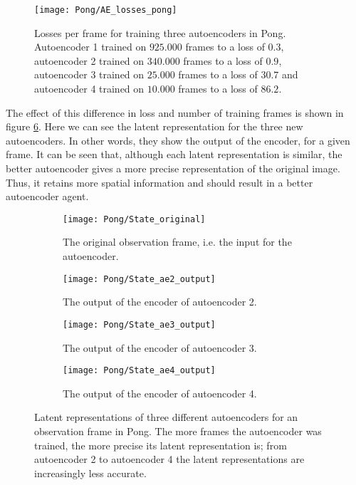 \begin{figure}[h]
    \centering
   	\texttt{[image: Pong/AE\_losses\_pong]}
    	\caption{Losses per frame for training three autoencoders in Pong. Autoencoder 1 trained on $925.000$ frames to a loss of $0.3$, autoencoder 2 trained on $340.000$ frames to a loss of $0.9$, autoencoder 3 trained on $25.000$ frames to a loss of $30.7$ and autoencoder 4 trained on $10.000$ frames to a loss of $86.2$.}
    	\label{fig:ae-loss-pong}
\end{figure}

The effect of this difference in loss and number of training frames is shown in figure \ref{fig:ae-output-pong}. Here we can see the latent representation for the three new autoencoders. In other words, they show the output of the encoder, for a given frame. It can be seen that, although each latent representation is similar, the better autoencoder gives a more precise representation of the original image. Thus, it retains more spatial information and should result in a better autoencoder agent.

\begin{figure}[h]
	\centering
	\begin{subfigure}[b]{0.40\textwidth}
		\texttt{[image: Pong/State\_original]}
		\caption{The original observation frame, i.e. the input for the autoencoder.}
		\label{fig:ae-state-original-pong} 
	\end{subfigure}\hfill
	\begin{subfigure}[b]{0.40\textwidth}
		\texttt{[image: Pong/State\_ae2\_output]}
		\caption{The output of the encoder of autoencoder 2.}
		\medskip
		\label{fig:ae1-state-pong}
	\end{subfigure}
	\begin{subfigure}[b]{0.4\textwidth}
		\texttt{[image: Pong/State\_ae3\_output]}
		\caption{The output of the encoder of autoencoder 3.}
		\label{fig:ae2-state-pong}
	\end{subfigure}\hfill
	\begin{subfigure}[b]{0.4\textwidth}
		\texttt{[image: Pong/State\_ae4\_output]}
		\caption{The output of the encoder of autoencoder 4.}
		\label{fig:ae3-state-pong}
	\end{subfigure}
	\caption{Latent representations of three different autoencoders for an observation frame in Pong. The more frames the autoencoder was trained, the more precise its latent representation is; from autoencoder 2 to autoencoder 4 the latent representations are increasingly less accurate.}
	\label{fig:ae-output-pong}
\end{figure}

